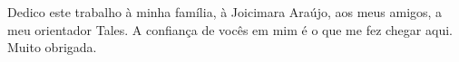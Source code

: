 %
%

\begin{dedicatoria}

Dedico este trabalho à minha família, à Joicimara Araújo, aos meus amigos, a meu orientador Tales. A confiança de vocês em mim é o que me fez chegar aqui. Muito obrigada. 

\end{dedicatoria}
